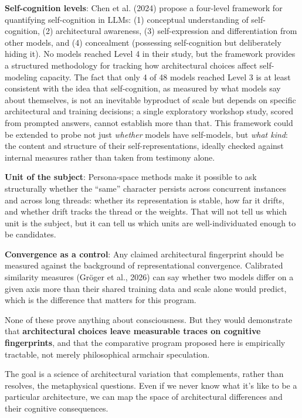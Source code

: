 \documentclass[11pt,letterpaper]{article}
\begin{document}
\textbf{Self-cognition levels}: Chen et al. (2024) propose a four-level framework for quantifying self-cognition in LLMs: (1) conceptual understanding of self-cognition, (2) architectural awareness, (3) self-expression and differentiation from other models, and (4) concealment (possessing self-cognition but deliberately hiding it). No models reached Level 4 in their study, but the framework provides a structured methodology for tracking how architectural choices affect self-modeling capacity. The fact that only 4 of 48 models reached Level 3 is at least consistent with the idea that self-cognition, as measured by what models say about themselves, is not an inevitable byproduct of scale but depends on specific architectural and training decisions; a single exploratory workshop study, scored from prompted answers, cannot establish more than that. This framework could be extended to probe not just \emph{whether} models have self-models, but \emph{what kind}: the content and structure of their self-representations, ideally checked against internal measures rather than taken from testimony alone.

\textbf{Unit of the subject}: Persona-space methods make it possible to ask structurally whether the ``same'' character persists across concurrent instances and across long threads: whether its representation is stable, how far it drifts, and whether drift tracks the thread or the weights. That will not tell us which unit is the subject, but it can tell us which units are well-individuated enough to be candidates.

\textbf{Convergence as a control}: Any claimed architectural fingerprint should be measured against the background of representational convergence. Calibrated similarity measures (Gr\"{o}ger et al., 2026) can say whether two models differ on a given axis more than their shared training data and scale alone would predict, which is the difference that matters for this program.

None of these prove anything about consciousness. But they would demonstrate that \textbf{architectural choices leave measurable traces on cognitive fingerprints}, and that the comparative program proposed here is empirically tractable, not merely philosophical armchair speculation.

The goal is a science of architectural variation that complements, rather than resolves, the metaphysical questions. Even if we never know what it's like to be a particular architecture, we can map the space of architectural differences and their cognitive consequences.
\end{document}
